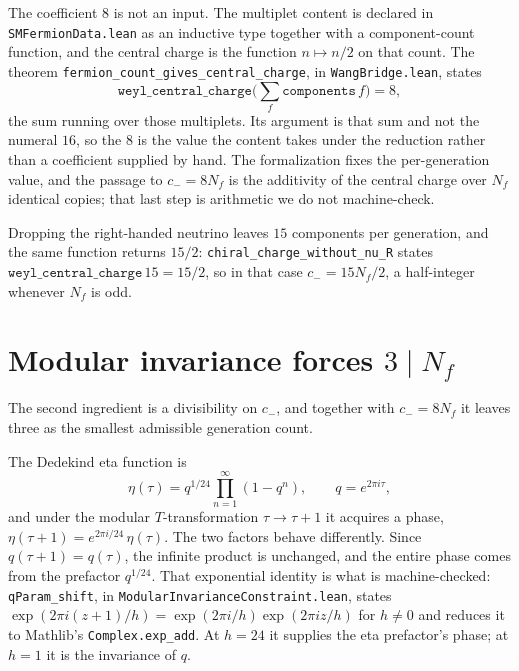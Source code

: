 \documentclass[aps,prl,twocolumn,superscriptaddress,nofootinbib]{revtex4-2}
\begin{document}
The coefficient $8$ is not an input. The multiplet content is declared
in \texttt{SMFermionData.lean} as an inductive type together with a
component-count function, and the central charge is the function
$n \mapsto n/2$ on that count. The theorem
\texttt{fermion\_count\_gives\_central\_charge}, in
\texttt{WangBridge.lean}, states
\begin{equation*}
\texttt{weyl\_central\_charge}
\Big( \textstyle\sum_{f} \texttt{components}\, f \Big) = 8 ,
\end{equation*}
the sum running over those multiplets. Its argument is that sum and not
the numeral $16$, so the $8$ is the value the content takes under the
reduction rather than a coefficient supplied by hand. The formalization
fixes the per-generation value, and the passage to $c_- = 8 N_f$ is the
additivity of the central charge over $N_f$ identical copies; that last
step is arithmetic we do not machine-check.

Dropping the right-handed neutrino leaves $15$ components per
generation, and the same function returns $15/2$:
\texttt{chiral\_charge\_without\_nu\_R} states
$\texttt{weyl\_central\_charge}\,15 = 15/2$, so in that case
$c_- = 15 N_f / 2$, a half-integer whenever $N_f$ is odd.

\section{Modular invariance forces $3 \mid N_f$}
\label{sec:framing}

The second ingredient is a divisibility on $c_-$, and together with
$c_- = 8 N_f$ it leaves three as the smallest admissible generation
count.

The Dedekind eta function is
\begin{equation}
\eta(\tau) = q^{1/24} \prod_{n=1}^{\infty}(1 - q^n),
\qquad q = e^{2\pi i \tau},
\end{equation}
and under the modular $T$-transformation $\tau \to \tau + 1$ it
acquires a phase, $\eta(\tau+1) = e^{2\pi i/24}\,\eta(\tau)$. The two
factors behave differently. Since $q(\tau+1) = q(\tau)$, the infinite
product is unchanged, and the entire phase comes from the prefactor
$q^{1/24}$. That exponential identity is what is machine-checked:
\texttt{qParam\_shift}, in \texttt{ModularInvarianceConstraint.lean},
states $\exp(2\pi i (z+1)/h) = \exp(2\pi i/h)\exp(2\pi i z/h)$ for
$h \neq 0$ and reduces it to Mathlib's \texttt{Complex.exp\_add}. At
$h = 24$ it supplies the eta prefactor's phase; at $h = 1$ it is the
invariance of $q$.
\end{document}

